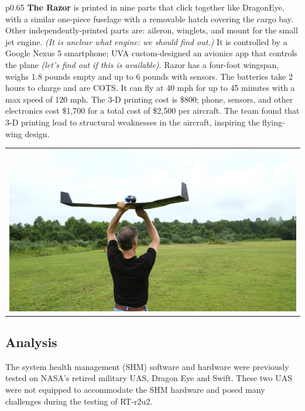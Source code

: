 \documentclass[]{article}
\begin{document}
\begin{table}[H]
\begin{minipage}[b]{0.65\linewidth}
\begin{tabular}{*{1}{p{0.65\textwidth}}}
{\bf The Razor} is printed in nine parts that click together like DragonEye, with a similar one-piece fuselage with a removable hatch covering the cargo bay. Other independently-printed parts are: aileron, winglets, and mount for the small jet engine. \emph{(It is unclear what engine: we should find out.)} It is controlled by a Google Nexus 5 smartphone; UVA custom-designed an avionics app that controls the plane \emph{(let's find out if this is available)}. Razor has a four-foot wingspan, weighs 1.8 pounds empty and up to 6 pounds with sensors. The batteries take 2 hours to charge and are COTS. It can fly at 40 mph for up to 45 minutes with a max speed of 120 mph. The 3-D printing cost is \$800; phone, sensors, and other electronics cost \$1,700 for a total cost of \$2,500 per aircraft. The team found that 3-D printing lead to structural weaknesses in the aircraft, inspiring the flying-wing design.
\end{tabular}
\end{minipage}
\hfill
\begin{minipage}[b]{0.5\linewidth}
\begin{tabular}{*{1}{p{}}}
\includegraphics[height=8\baselineskip]{razor}
\end{tabular}
\end{minipage}
\end{table}


\subsection{Analysis}

The system health management (SHM) software and hardware were previously tested on NASA's retired military UAS, Dragon Eye and Swift.  These two UAS were not equipped to accommodate the SHM hardware and posed many challenges during the testing of RT-r2u2.  
\end{document}
